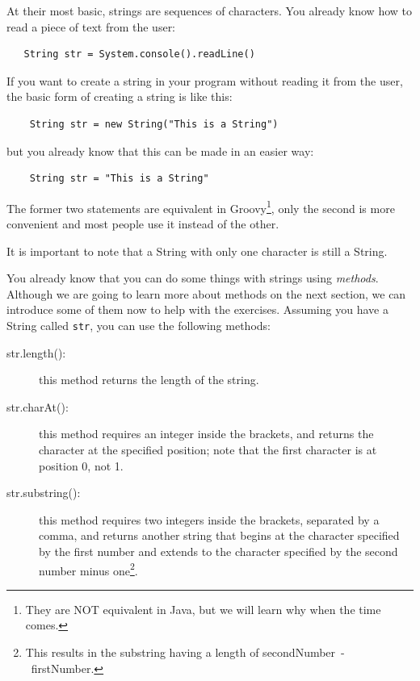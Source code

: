 At their most basic, strings are sequences of characters. You already
know how to read a piece of text from the user: 

\begin{verbatim}
   String str = System.console().readLine()
\end{verbatim}

If you want to create a string in your program without reading it from
the user, the basic form of creating a string is like this: 

\begin{verbatim}
    String str = new String("This is a String")
\end{verbatim}

but you already know that this can be made in an easier way: 

\begin{verbatim}
    String str = "This is a String"
\end{verbatim}

The former two statements are equivalent in Groovy\footnote{They are
  NOT equivalent in Java, but we will learn why when the time
  comes.}, only the second is more convenient and most people use it
instead of the other. 

It is important to note that a String with only one character is
still a String. 


% 

You already know that you can do some things with strings using
\emph{methods}. Although we are going to learn more about methods on
the next section, we can introduce some of them now to help with the
exercises. Assuming you have a String called \verb+str+, you can use
the following methods:

\begin{description}
\item[str.length(): ] this method returns the length of the string.
\item[str.charAt(): ] this method requires an integer inside the
  brackets, and returns the character at the specified position;
  note that the first character is at position 0, not 1.
\item[str.substring(): ] this method requires two integers inside the
  brackets, separated by a comma, and returns another string that
  begins at the character specified by the first number and extends to
  the character specified by the second number minus one\footnote{This
  results in the substring having a length of
  secondNumber~-~firstNumber.}.  
\end{description}

